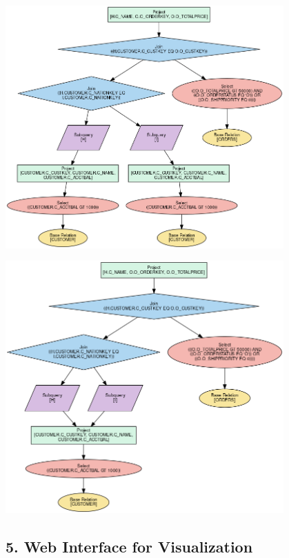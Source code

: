 \documentclass[12pt]{article}
\begin{document}
\begin{table}[H]
  \centering
   \begin{minipage}[t]{0.48\textwidth}
    \centering
    \includegraphics[width=0.8\textwidth]{images/cse_before.png}
  \end{minipage}
  \hfill
  \begin{minipage}[t]{0.48\textwidth}
    \centering
    \includegraphics[width=0.8\textwidth]{images/cse_after.png}
  \end{minipage}
\end{table}


\subsection*{5. Web Interface for Visualization}
\end{document}
